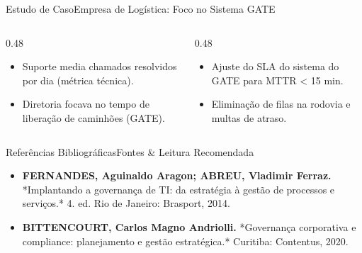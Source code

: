 \begin{senaiframe}{Estudo de Caso}{Empresa de Logística: Foco no Sistema GATE}
  \begin{columns}[t]
    \begin{column}{0.48\textwidth}
      \begin{tcolorbox}[senaibluecard, title={Situação Inicial}]
        \begin{itemize}
          \item Suporte media chamados resolvidos por dia (métrica técnica).
          \item Diretoria focava no tempo de liberação de caminhões (GATE).
        \end{itemize}
      \end{tcolorbox}
    \end{column}
    \begin{column}{0.48\textwidth}
      \begin{tcolorbox}[senaigreencard, title={Alinhamento por KPI}]
        \begin{itemize}
          \item Ajuste do SLA do sistema do GATE para MTTR < 15 min.
          \item Eliminação de filas na rodovia e multas de atraso.
        \end{itemize}
      \end{tcolorbox}
    \end{column}
  \end{columns}
\end{senaiframe}

\begin{senaiframe}{Referências Bibliográficas}{Fontes \& Leitura Recomendada}
  \begin{tcolorbox}[senaicard, title={Obras de Referência}]
    \begin{itemize}
      \item \textbf{FERNANDES, Aguinaldo Aragon; ABREU, Vladimir Ferraz.} *Implantando a governança de TI: da estratégia à gestão de processos e serviços.* 4. ed. Rio de Janeiro: Brasport, 2014.
      \item \textbf{BITTENCOURT, Carlos Magno Andriolli.} *Governança corporativa e compliance: planejamento e gestão estratégica.* Curitiba: Contentus, 2020.
    \end{itemize}
  \end{tcolorbox}
\end{senaiframe}

